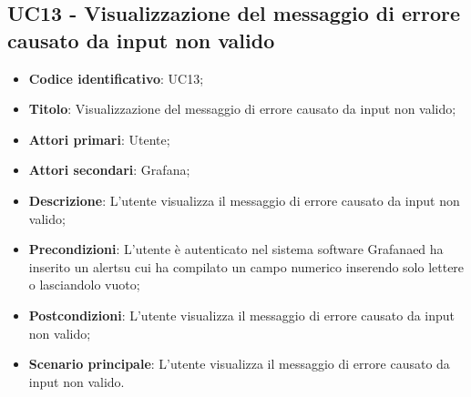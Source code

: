 \subsection{UC13 - Visualizzazione del messaggio di errore causato da input non valido}
\begin{itemize}
	\item \textbf{Codice identificativo}: UC13;
	\item \textbf{Titolo}: Visualizzazione del messaggio di errore causato da input non valido;
	\item \textbf{Attori primari}: Utente;
	\item \textbf{Attori secondari}: Grafana\glo;
	\item \textbf{Descrizione}: L'utente visualizza il messaggio di errore causato da input non valido;
	\item \textbf{Precondizioni}: L'utente è autenticato nel sistema software Grafana\glosp ed ha inserito un alert\glosp su cui ha compilato un campo numerico inserendo solo lettere o lasciandolo vuoto;
	\item \textbf{Postcondizioni}: L'utente visualizza il messaggio di errore causato da input non valido;
	\item \textbf{Scenario principale}: L'utente visualizza il messaggio di errore causato da input non valido.
\end{itemize}
